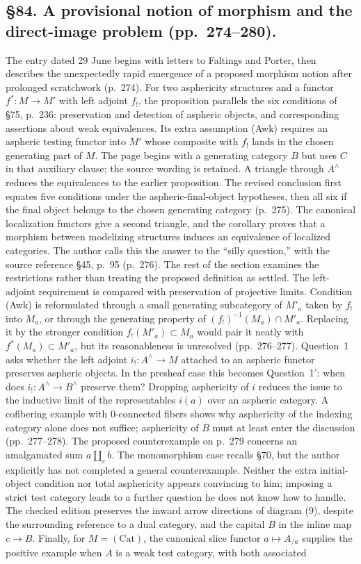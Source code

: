 \documentclass[10pt,oneside]{book}
\begin{document}
\subsection*{\S84. A provisional notion of morphism and the direct-image problem (pp.\ 274--280).}
The entry dated 29 June begins with letters to Faltings and Porter, then describes the unexpectedly rapid emergence of a proposed morphism notion after prolonged scratchwork (p.\ 274). For two asphericity structures and a functor $f^*:M\to M'$ with left adjoint $f_!$, the proposition parallels the six conditions of \S75, p.\ 236: preservation and detection of aspheric objects, and corresponding assertions about weak equivalences. Its extra assumption (Awk) requires an aspheric testing functor into $M'$ whose composite with $f_!$ lands in the chosen generating part of $M$. The page begins with a generating category $B$ but uses $C$ in that auxiliary clause; the source wording is retained. A triangle through $A^\wedge$ reduces the equivalences to the earlier proposition. The revised conclusion first equates five conditions under the aspheric-final-object hypotheses, then all six if the final object belongs to the chosen generating category (p.\ 275). The canonical localization functors give a second triangle, and the corollary proves that a morphism between modelizing structures induces an equivalence of localized categories. The author calls this the answer to the “silly question,” with the source reference \S45, p.\ 95 (p.\ 276). The rest of the section examines the restrictions rather than treating the proposed definition as settled. The left-adjoint requirement is compared with preservation of projective limits. Condition (Awk) is reformulated through a small generating subcategory of $M'_a$ taken by $f_!$ into $M_a$, or through the generating property of $(f_!)^{-1}(M_a)\cap M'_a$. Replacing it by the stronger condition $f_!(M'_a)\subset M_a$ would pair it neatly with $f^*(M_a)\subset M'_a$, but its reasonableness is unresolved (pp.\ 276--277). Question~1 asks whether the left adjoint $i_!:A^\wedge\to M$ attached to an aspheric functor preserves aspheric objects. In the presheaf case this becomes Question~1': when does $i_!:A^\wedge\to B^\wedge$ preserve them? Dropping asphericity of $i$ reduces the issue to the inductive limit of the representables $i(a)$ over an aspheric category. A cofibering example with 0-connected fibers shows why asphericity of the indexing category alone does not suffice; asphericity of $B$ must at least enter the discussion (pp.\ 277--278). The proposed counterexample on p.\ 279 concerns an amalgamated sum $a\amalg_c b$. The monomorphism case recalls \S70, but the author explicitly has not completed a general counterexample. Neither the extra initial-object condition nor total asphericity appears convincing to him; imposing a strict test category leads to a further question he does not know how to handle. The checked edition preserves the inward arrow directions of diagram (9), despite the surrounding reference to a dual category, and the capital $B$ in the inline map $c\to B$. Finally, for $M=(\mathrm{Cat})$, the canonical slice functor $a\mapsto A_{/a}$ supplies the positive example when $A$ is a weak test category, with both associated 
\end{document}

